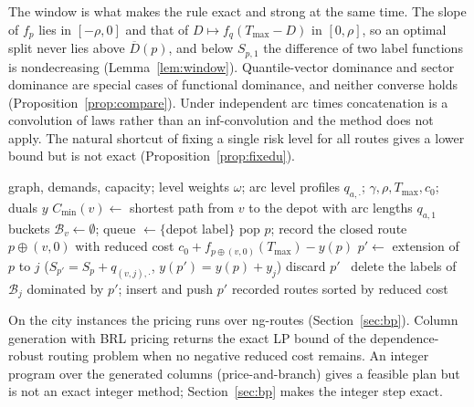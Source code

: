 \documentclass[preprint,11pt]{elsarticle}
\theoremstyle{definition}
\theoremstyle{remark}
\newcommand{\Dh}{\overline{D}}
\begin{document}
The window is what makes the rule exact and strong at the same time. The slope of $f_p$ lies in $[-\rho,0]$ and that of $D\mapsto f_q(T_{\max}-D)$ in $[0,\rho]$, so an optimal split never lies above $\Dh(p)$, and below $S_{p,1}$ the difference of two label functions is nondecreasing (Lemma~\ref{lem:window}). Quantile-vector dominance and sector dominance are special cases of functional dominance, and neither converse holds (Proposition~\ref{prop:compare}). Under independent arc times concatenation is a convolution of laws rather than an inf-convolution and the method does not apply. The natural shortcut of fixing a single risk level for all routes gives a lower bound but is not exact (Proposition~\ref{prop:fixedu}).

\begin{algorithm}[t]
\caption{BRL pricing for the dependence-robust routing problem ($H=1$)}\label{alg:brl}
\begin{algorithmic}[1]
\Require graph, demands, capacity; level weights $\omega$; arc level profiles $q_{a,\cdot}$; $\gamma,\rho,T_{\max},c_0$; duals $y$
\State $C_{\min}(v)\gets$ shortest path from $v$ to the depot with arc lengths $q_{a,1}$
\State buckets $\mathcal B_v\gets\emptyset$; queue $\gets\{$depot label$\}$
  \State pop $p$; record the closed route $p\oplus(v,0)$ with reduced cost $c_0+f_{p\oplus(v,0)}(T_{\max})-y(p)$
    \State $p'\gets$ extension of $p$ to $j$ ($S_{p'}=S_p+q_{(v,j),\cdot}$, $y(p')=y(p)+y_j$)
     discard $p'$
    \Else\ delete the labels of $\mathcal B_j$ dominated by $p'$; insert and push $p'$
    \EndIf
  \EndFor
\EndWhile
\State \Return recorded routes sorted by reduced cost
\end{algorithmic}
\end{algorithm}

On the city instances the pricing runs over ng-routes (Section~\ref{sec:bp}). Column generation \citep{Feillet2004,Irnich2005} with BRL pricing returns the exact LP bound of the dependence-robust routing problem when no negative reduced cost remains. An integer program over the generated columns (price-and-branch) gives a feasible plan but is not an exact integer method; Section~\ref{sec:bp} makes the integer step exact.
\end{document}
